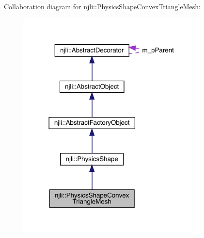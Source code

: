 Collaboration diagram for njli\+:\+:Physics\+Shape\+Convex\+Triangle\+Mesh\+:\nopagebreak
\begin{figure}[H]
\begin{center}
\leavevmode
\includegraphics[width=273pt]{classnjli_1_1_physics_shape_convex_triangle_mesh__coll__graph}
\end{center}
\end{figure}
